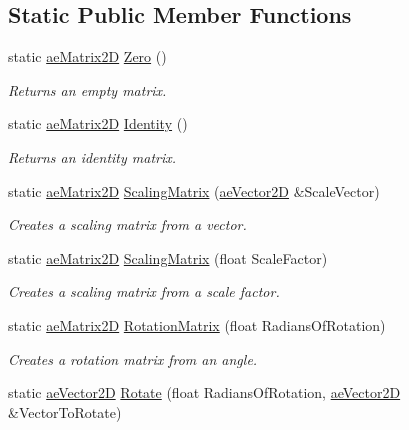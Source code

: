 \subsection*{Static Public Member Functions}
\begin{DoxyCompactItemize}
\item 
static \hyperlink{structae_core_1_1ae_matrix2_d}{ae\+Matrix2D} \hyperlink{structae_core_1_1ae_matrix2_d_a6eaa88ee905a7fb2afc16cc1cc5e5b9c}{Zero} ()
\begin{DoxyCompactList}\small\item\em Returns an empty matrix. \end{DoxyCompactList}\item 
static \hyperlink{structae_core_1_1ae_matrix2_d}{ae\+Matrix2D} \hyperlink{structae_core_1_1ae_matrix2_d_a9e8afacfd6e84df2a21b1b828cd8b85a}{Identity} ()
\begin{DoxyCompactList}\small\item\em Returns an identity matrix. \end{DoxyCompactList}\item 
static \hyperlink{structae_core_1_1ae_matrix2_d}{ae\+Matrix2D} \hyperlink{structae_core_1_1ae_matrix2_d_adc51ce28e58283df6fe8a3194d641e67}{Scaling\+Matrix} (\hyperlink{structae_core_1_1ae_vector2_d}{ae\+Vector2D} \&Scale\+Vector)
\begin{DoxyCompactList}\small\item\em Creates a scaling matrix from a vector. \end{DoxyCompactList}\item 
static \hyperlink{structae_core_1_1ae_matrix2_d}{ae\+Matrix2D} \hyperlink{structae_core_1_1ae_matrix2_d_ad64820a0a20b0a77c7a69c830616d596}{Scaling\+Matrix} (float Scale\+Factor)
\begin{DoxyCompactList}\small\item\em Creates a scaling matrix from a scale factor. \end{DoxyCompactList}\item 
static \hyperlink{structae_core_1_1ae_matrix2_d}{ae\+Matrix2D} \hyperlink{structae_core_1_1ae_matrix2_d_a8fd10932b1b46076c62e2d8b8d16dc4e}{Rotation\+Matrix} (float Radians\+Of\+Rotation)
\begin{DoxyCompactList}\small\item\em Creates a rotation matrix from an angle. \end{DoxyCompactList}\item 
static \hyperlink{structae_core_1_1ae_vector2_d}{ae\+Vector2D} \hyperlink{structae_core_1_1ae_matrix2_d_a8c9070193161405c0f66c0c85c7cd3ee}{Rotate} (float Radians\+Of\+Rotation, \hyperlink{structae_core_1_1ae_vector2_d}{ae\+Vector2D} \&Vector\+To\+Rotate)

\end{DoxyCompactItemize}
